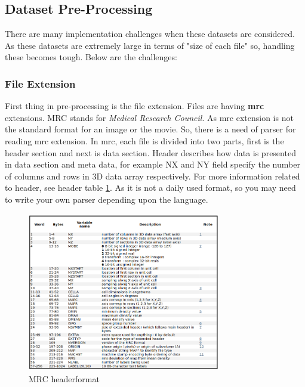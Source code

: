 \documentclass[twoside]{iitbreport}
\begin{document}
\subsection{Dataset Pre-Processing}
There are many implementation challenges when these datasets are considered. As these datasets are extremely large in terms of "size of each file" so, handling these becomes tough. Below are the challenges:

\subsubsection{File Extension}
First thing in pre-processing is the file extension. Files are having  \textbf{mrc} extensions. MRC stands for \textit{Medical Research Council}. As mrc extension is not the standard format for an image or the movie. So, there is a need of parser for reading mrc extension. In mrc, each file is divided into two parts, first is the header section and next is data section. Header describes how data is presented in data section and meta data, for example NX and NY field specify the number of columns and rows in 3D data array respectively. For more information related to header, see header table \ref{fig:mrc-header}. As it is not a daily used format, so you may need to write your own parser depending upon the language.

\begin{figure}[h]
\includegraphics[width=0.75\textwidth]{mrc_header.png}
\centering
\captionsetup{justification=centering}
\caption{MRC header\protect\footnotemark format}
\label{fig:mrc-header}
\end{figure}
\end{document}
